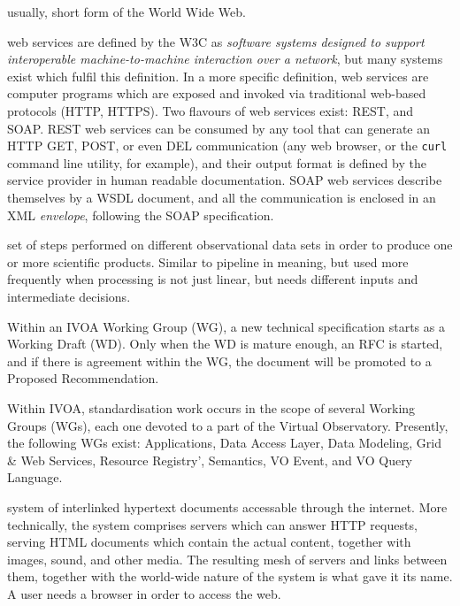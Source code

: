 {
    	usually, short form of the \gls{World Wide Web}.
}

{
    	web services are defined by the \gls{W3C} as \emph{software
        systems designed to support interoperable machine-to-machine
        interaction over a network}, but many systems exist which
        fulfil this definition. In a more specific definition, web
        services are computer programs which are exposed and invoked
        via traditional web-based protocols (\gls{HTTP}, \gls{HTTPS}).
        Two flavours of web services exist: \gls{REST}, and \gls{SOAP}.
        REST web services can be consumed by any tool that can generate
        an HTTP GET, POST, or even DEL communication (any web browser,
        or the \texttt{curl} command line utility, for example),
		and their output
        format is defined by the service provider in human readable
        documentation. SOAP web services describe themselves by a
        \gls{WSDL} document, and all the communication is enclosed in
        an \gls{XML} \emph{envelope}, following the SOAP specification.
}

{
    	set of steps performed on different observational data sets in
        order to produce one or more scientific products. Similar to
        pipeline in meaning, but used more frequently when processing
        is not just linear, but needs different inputs and intermediate
        decisions.
}

{
    	Within an \gls{IVOA} \gls{Working Group} (WG), a new technical
        specification starts as a \gls{Working Draft} (WD). Only when
        the WD is mature enough, an \gls{RFC} is started, and if there
        is agreement within the WG, the document will be promoted to a
        \gls{Proposed Recommendation}.
}

{
    	Within \gls{IVOA}, standardisation work occurs in the scope of
        several Working Groups (WGs), each one devoted to a part of the
        Virtual Observatory. Presently, the following WGs exist:
        \gls{Applications}, \gls{Data Access Layer}, \gls{Data
        Modeling}, \gls{Grid & Web Services}, \gls{Resource Registry}',
        \gls{Semantics}, \gls{VO Event}, and \gls{VO Query Language}.
}

{
    	system of interlinked \gls{hypertext} documents accessable
        through the internet. More technically, the system comprises
        servers which can answer \gls{HTTP} requests, serving
        \gls{HTML} documents which contain the actual content, together
        with images, sound, and other media. The resulting mesh of
        servers and links between them, together with the world-wide
        nature of the system is what gave it its name. A user needs a
        \gls{browser} in order to access the web.
}

